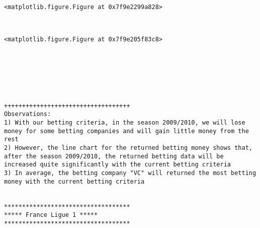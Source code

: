 \documentclass[11pt]{article}
\begin{document}
    
    \begin{verbatim}
<matplotlib.figure.Figure at 0x7f9e2299a828>
    \end{verbatim}

    
    \begin{center}
    \end{center}
    { \hspace*{\fill} \\}
    
    
    \begin{verbatim}
<matplotlib.figure.Figure at 0x7f9e205f83c8>
    \end{verbatim}

    
    \begin{center}
    \end{center}
    { \hspace*{\fill} \\}
    
    \begin{center}
    \end{center}
    { \hspace*{\fill} \\}
    
    \begin{center}
    \end{center}
    { \hspace*{\fill} \\}
    
    \begin{Verbatim}[commandchars=\\\{\}]
+++++++++++++++++++++++++++++++++++
Observations: 
1) With our betting criteria, in the season 2009/2010, we will lose money for some betting companies and will gain little money from the rest
2) However, the line chart for the returned betting money shows that, after the season 2009/2010, the returned betting data will be increased quite significantly with the current betting criteria
3) In average, the betting company "VC" will returned the most betting money with the current betting criteria


***********************************
***** France Ligue 1 *****
***********************************

    \end{Verbatim}
\end{document}
